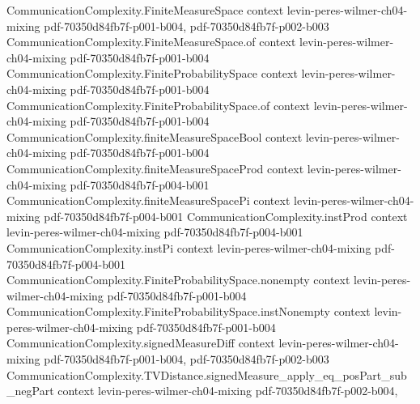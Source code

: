 \begin{lemma}
\label{CommunicationComplexity.TVDistance.event_abs_signedMeasureDiff_le_half_totalVariation}
\leanok
{}
\proofstep
  {CommunicationComplexity.FiniteMeasureSpace}
  {context}
  {levin-peres-wilmer-ch04-mixing}
  {pdf-70350d84fb7f-p001-b004,
    pdf-70350d84fb7f-p002-b003}
\proofstep
  {CommunicationComplexity.FiniteMeasureSpace.of}
  {context}
  {levin-peres-wilmer-ch04-mixing}
  {pdf-70350d84fb7f-p001-b004}
\proofstep
  {CommunicationComplexity.FiniteProbabilitySpace}
  {context}
  {levin-peres-wilmer-ch04-mixing}
  {pdf-70350d84fb7f-p001-b004}
\proofstep
  {CommunicationComplexity.FiniteProbabilitySpace.of}
  {context}
  {levin-peres-wilmer-ch04-mixing}
  {pdf-70350d84fb7f-p001-b004}
\proofstep
  {CommunicationComplexity.finiteMeasureSpaceBool}
  {context}
  {levin-peres-wilmer-ch04-mixing}
  {pdf-70350d84fb7f-p001-b004}
\proofstep
  {CommunicationComplexity.finiteMeasureSpaceProd}
  {context}
  {levin-peres-wilmer-ch04-mixing}
  {pdf-70350d84fb7f-p004-b001}
\proofstep
  {CommunicationComplexity.finiteMeasureSpacePi}
  {context}
  {levin-peres-wilmer-ch04-mixing}
  {pdf-70350d84fb7f-p004-b001}
\proofstep
  {CommunicationComplexity.instProd}
  {context}
  {levin-peres-wilmer-ch04-mixing}
  {pdf-70350d84fb7f-p004-b001}
\proofstep
  {CommunicationComplexity.instPi}
  {context}
  {levin-peres-wilmer-ch04-mixing}
  {pdf-70350d84fb7f-p004-b001}
\proofstep
  {CommunicationComplexity.FiniteProbabilitySpace.nonempty}
  {context}
  {levin-peres-wilmer-ch04-mixing}
  {pdf-70350d84fb7f-p001-b004}
\proofstep
  {CommunicationComplexity.FiniteProbabilitySpace.instNonempty}
  {context}
  {levin-peres-wilmer-ch04-mixing}
  {pdf-70350d84fb7f-p001-b004}
\proofstep
  {CommunicationComplexity.signedMeasureDiff}
  {context}
  {levin-peres-wilmer-ch04-mixing}
  {pdf-70350d84fb7f-p001-b004,
    pdf-70350d84fb7f-p002-b003}
\proofstep
  {CommunicationComplexity.TVDistance.signedMeasure_apply_eq_posPart_sub_negPart}
  {context}
  {levin-peres-wilmer-ch04-mixing}
  {pdf-70350d84fb7f-p002-b004,
}
\end{lemma}
